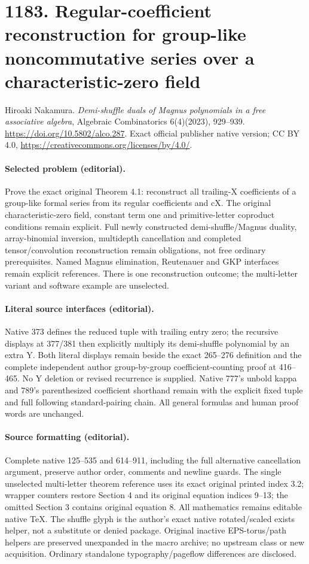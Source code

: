 \documentclass[10pt]{article}
\theoremstyle{definition}
\theoremstyle{remark}
\begin{document}
\section*{1183. Regular-coefficient reconstruction for group-like noncommutative series over a characteristic-zero field}
Hiroaki Nakamura. \emph{Demi-shuffle duals of Magnus polynomials in a free associative algebra}, Algebraic Combinatorics 6(4)(2023), 929--939. \url{https://doi.org/10.5802/alco.287}. Exact official publisher native version; CC BY 4.0, \url{https://creativecommons.org/licenses/by/4.0/}.\par
\paragraph{Selected problem (editorial).} Prove the exact original Theorem 4.1: reconstruct all trailing-X coefficients of a group-like formal series from its regular coefficients and cX. The original characteristic-zero field, constant term one and primitive-letter coproduct conditions remain explicit. Full newly constructed demi-shuffle/Magnus duality, array-binomial inversion, multidepth cancellation and completed tensor/convolution reconstruction remain obligations, not free ordinary prerequisites. Named Magnus elimination, Reutenauer and GKP interfaces remain explicit references. There is one reconstruction outcome; the multi-letter variant and software example are unselected.
\paragraph{Literal source interfaces (editorial).} Native 373 defines the reduced tuple with trailing entry zero; the recursive displays at 377/381 then explicitly multiply its demi-shuffle polynomial by an extra Y. Both literal displays remain beside the exact 265--276 definition and the complete independent author group-by-group coefficient-counting proof at 416--465. No Y deletion or revised recurrence is supplied. Native 777's unbold kappa and 789's parenthesized coefficient shorthand remain with the explicit fixed tuple and full following standard-pairing chain. All general formulas and human proof words are unchanged.
\paragraph{Source formatting (editorial).} Complete native 125--535 and 614--911, including the full alternative cancellation argument, preserve author order, comments and newline guards. The single unselected multi-letter theorem reference uses its exact original printed index 3.2; wrapper counters restore Section 4 and its original equation indices 9--13; the omitted Section 3 contains original equation 8. All mathematics remains editable native TeX. The shuffle glyph is the author's exact native rotated/scaled exists helper, not a substitute or denied package. Original inactive EPS-torus/path helpers are preserved unexpanded in the macro archive; no upstream class or new acquisition. Ordinary standalone typography/pageflow differences are disclosed.
\clearpage
\end{document}
